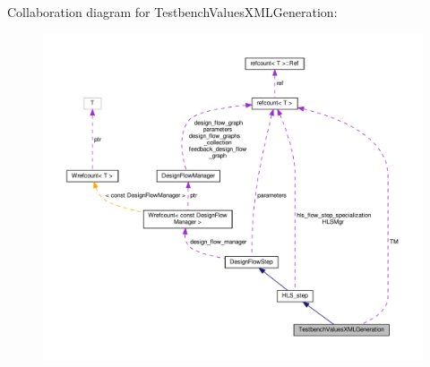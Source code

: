 Collaboration diagram for Testbench\+Values\+X\+M\+L\+Generation\+:
\nopagebreak
\begin{figure}[H]
\begin{center}
\leavevmode
\includegraphics[width=350pt]{d5/dda/classTestbenchValuesXMLGeneration__coll__graph}
\end{center}
\end{figure}
